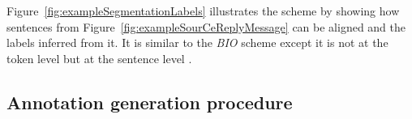 








%
%
Figure~\ref{fig:exampleSegmentationLabels} illustrates the scheme by showing how sentences from Figure~\ref{fig:exampleSourCeReplyMessage} can be aligned and the labels inferred from it. 
%
It is similar to the \textit{BIO} %
scheme except it is not at the token level but at the sentence level \cite{ratinov:2009:conll}. %



\subsection{Annotation generation procedure}
\label{}


